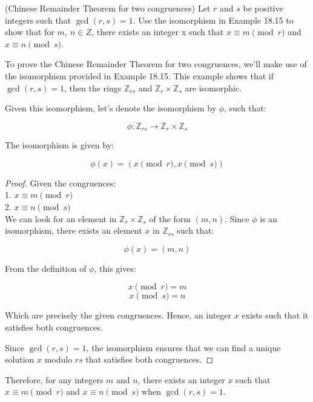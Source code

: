 \documentclass[12pt]{amsart}
\theoremstyle{definition}
\numberwithin{equation}{section}
\theoremstyle{plain}
\newcommand{\Z}{\mathbb{Z}}
\begin{document}
\begin{exercise}{52}
    (Chinese Remainder Theorem for two congruences) Let $r$ and $s$ be positive integers such that $\gcd(r, s) = 1$.
Use the isomorphism in Example 18.15 to show that for $m , \ n \in Z$, there exists an integer x such that $x \equiv m
\pmod r $ and $x \equiv n \pmod s$.


To prove the Chinese Remainder Theorem for two congruences, we'll make use of the isomorphism provided in Example 18.15. This example shows that if \( \gcd(r, s) = 1 \), then the rings \( \Z_{rs} \) and \( \Z_r \times \Z_s \) are isomorphic.

Given this isomorphism, let's denote the isomorphism by \( \phi \), such that:

\[ \phi: \Z_{rs} \to \Z_r \times \Z_s \]

The isomorphism is given by:

\[ \phi(x) = (x \pmod r, x \pmod s) \]

\begin{proof}
Given the congruences:\\
1. \( x \equiv m \pmod r \)\\
2. \( x \equiv n \pmod s \)\\

We can look for an element in \( \Z_r \times \Z_s \) of the form \( (m, n) \). Since \( \phi \) is an isomorphism, there exists an element \( x \) in \( \Z_{rs} \) such that:

\[ \phi(x) = (m, n) \]

From the definition of \( \phi \), this gives:

\[ x \pmod r = m \]
\[ x \pmod s = n \]

Which are precisely the given congruences. Hence, an integer \( x \) exists such that it satisfies both congruences.

Since \( \gcd(r, s) = 1 \), the isomorphism ensures that we can find a unique solution \( x \) modulo \( rs \) that satisfies both congruences.
\end{proof}

Therefore, for any integers \( m \) and \( n \), there exists an integer \( x \) such that \( x \equiv m \pmod r \) and \( x \equiv n \pmod s \) when \( \gcd(r, s) = 1 \).
\end{exercise}
\end{document}
